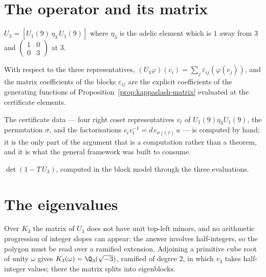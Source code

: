 
\section{The operator and its matrix}

\begin{definition}
  \label{def:u3}
  \leanok
  $U_3 = [U_1(9)\, \eta_3\, U_1(9)]$ where $\eta_3$ is the adelic element which is $1$ away from
  $3$ and $\left(\begin{smallmatrix}1&0\\0&3\end{smallmatrix}\right)$ at $3$.
\end{definition}

\begin{theorem}
  \label{thm:u3-matrix}
  \leanok
  With respect to the three representatives, $(U_3\varphi)(c_i) = \sum_j \varepsilon_{ij}
  (\varphi(c_j))$, and the matrix coefficients of the blocks $\varepsilon_{ij}$ are the explicit
  coefficients of the generating functions of Proposition~\ref{prop:kappaslash-matrix} evaluated
  at the certificate elements.
\end{theorem}

The certificate data --- four right coset representatives $v_t$ of $U_1(9)\eta_3 U_1(9)$, the
permutation $\sigma$, and the factorisations $c_i v_t^{-1} = d\, c_{\sigma(i,t)}\, u$ --- is
computed by hand; it is the only part of the argument that is a computation rather than a
theorem, and it is what the general framework was built to consume.

\begin{definition}
  \label{def:u3-det}
  \leanok
  $\det(1 - T\,U_3)$, computed in the block model through the three evaluations.
\end{definition}

\section{The eigenvalues}

Over $K_3$ the matrix of $U_3$ does not have unit top-left minors, and no arithmetic progression
of integer slopes can appear: the answer involves half-integers, so the polygon must be read over
a ramified extension.  Adjoining a primitive cube root of unity $\omega$ gives $K_3(\omega) =
\Q_3(\sqrt{-3})$, ramified of degree $2$, in which $v_3$ takes half-integer values; there the
matrix splits into eigenblocks.

